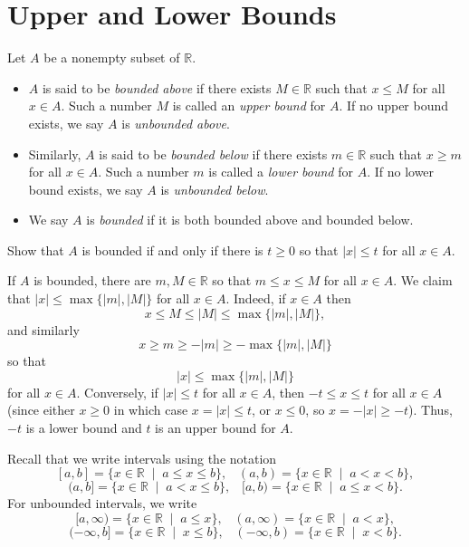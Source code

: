 \documentclass[11pt,dvipsnames]{book}
\def\R{\mathbb{R}}
\numberwithin{figure}{section} %
\numberwithin{table}{section} %
\begin{document}
\section{Upper and Lower Bounds}

\def\LUB{{\rm LUB}}
\def\GLB{{\rm GLB}}
\def\ve{\varepsilon}
\def\limn{\lim_{n\rightarrow\infty}}

\def\R{\mathbb{R}}

\begin{definition}
Let $A$ be a nonempty subset of $\R$.
\begin{itemize}
\item $A$ is said to be {\it bounded above} if
there exists $M\in\R$ such that $x\leq M$ for all $x\in A$. Such a number $M$ is called an {\it upper bound} for $A$. If no upper bound exists, we say $A$ is {\it unbounded above}.

\item Similarly, $A$ is said to be {\it bounded below} if
there exists $m\in\R$ such that $x\geq m$ for all $x\in A$. Such a number $m$ is called a {\it lower bound} for $A$. If no lower bound exists, we say $A$ is {\it unbounded below}.

\item We say $A$ is {\it bounded} if it is both bounded above and bounded below.\\
\end{itemize}
\end{definition}

\begin{exercise}
\label{ex:bounded}
Show that $A$ is bounded if and only if there is $t\geq 0$ so that  $|x|\leq t$ for all $x\in A$.
\begin{solution}
If $A$ is bounded, there are $m,M\in\mathbb{R}$ so that $m\leq x\leq M$ for all $x\in A$. We claim that $|x|\leq \max\{|m|,|M|\}$ for all $x\in A$. Indeed, if $x\in A$ then
\[
x\leq M\leq  |M| \leq \max\{|m|,|M|\},
\]
and similarly
\[
x\geq m \geq - |m| \geq -\max\{|m|,|M|\}
\]
so that
\[|x|\leq \max\{|m|,|M|\}\]
for all $x\in A$.
Conversely, if $|x|\leq t$ for all $x\in A$, then $-t\leq x\leq t$ for all $x\in A$ (since either $x\geq 0$ in which case $x=|x|\leq t$, or $x\leq 0$, so $x=-|x|\geq -t$). Thus, $-t$ is a lower bound and $t$ is an upper bound for $A$.
\end{solution}
\end{exercise}

Recall that we write intervals using the notation
\[
[a,b]=\{x\in\mathbb{R} \;\; | \;\; a\leq x\leq b\}, \;\;\;
(a,b)=\{x\in\mathbb{R} \;\; | \;\; a< x< b\},
\]
\[
(a,b]=\{x\in\mathbb{R} \;\; | \;\; a< x\leq b\}, \;\;\;
[a,b)=\{x\in\mathbb{R} \;\; | \;\; a\leq  x< b\}.
\]
For unbounded intervals, we write
\[
[a,\infty)=\{x\in\mathbb{R} \;\; | \;\; a\leq x \}, \;\;\;
(a,\infty)=\{x\in\mathbb{R} \;\; | \;\; a< x \},
\]
\[
(-\infty,b]=\{x\in\mathbb{R} \;\; | \;\;  x\leq b\}, \;\;\;
(-\infty,b)=\{x\in\mathbb{R} \;\; | \;\; x< b\}.
\]
\end{document}

